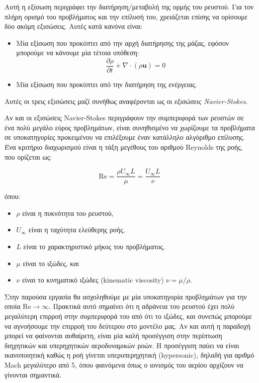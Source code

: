 Αυτή η εξίσωση περιγράφει την διατήρηση/μεταβολή της ορμής του ρευστού.
Για τον πλήρη ορισμό του προβλήματος και την επίλυσή του, χρειάζεται επίσης να ορίσουμε δύο ακόμη εξισώσεις.
Αυτές κατά κανόνα είναι:

\begin{itemize}
    \item Μία εξίσωση που προκύπτει από την αρχή διατήρησης της μάζας, εφόσον μπορούμε να κάνουμε μία τέτοια υπόθεση:
        \begin{equation*}
            \frac{\partial \rho}{\partial t} + \nabla \cdot \left( \rho \mathbf{u} \right) = 0
        \end{equation*}
    \item Μία εξίσωση που προκύπτει από την διατήρηση της ενέργειας.
\end{itemize}

Αυτές οι τρεις εξισώσεις μαζί συνήθως αναφέρονται ως οι \emph{εξισώσεις Navier-Stokes}.

Αν και οι εξισώσεις Navier-Stokes περιγράφουν την συμπεριφορά των ρευστών σε ένα πολύ μεγάλο εύρος προβλημάτων, είναι συνηθισμένο να χωρίζουμε τα προβλήματα σε υποκατηγορίες προκειμένου να επιλέξουμε έναν κατάλληλο αλγόριθμο επίλυσης.
Ένα κριτήριο διαχωρισμού είναι η τάξη μεγέθους του αριθμού Reynolds της ροής, που ορίζεται ως:

\begin{equation*}
    \mathrm{Re} = \frac{\rho U_{\infty} L}{\mu} = \frac{U_\infty L}{\nu}
\end{equation*}

όπου:

\begin{itemize}
    \item $\rho$ είναι η πυκνότητα του ρευστού,
    \item $U_{\infty}$ είναι η ταχύτητα ελεύθερης ροής,
    \item $L$ είναι το χαρακτηριστικό μήκος του προβλήματος,
    \item $\mu$ είναι το ιξώδες, και
    \item $\nu$ είναι το κινηματικό ιξώδες (kinematic viscosity) $\nu = \mu / \rho$.
\end{itemize}

Στην παρούσα εργασία θα ασχοληθούμε με μία υποκατηγορία προβλημάτων για την οποία $\mathrm{Re} \to \infty$.
Πρακτικά αυτό σημαίνει ότι η αδράνεια του ρευστού έχει πολύ μεγαλύτερη επιρροή στην συμπεριφορά του από ότι το ιξώδες, και συνεπώς μπορούμε να αγνοήσουμε την επιρροή του δεύτερου στο μοντέλο μας.
Αν και αυτή η παραδοχή μπορεί να φαίνονται αυθαίρετη, είναι μία καλή προσέγγιση στην περίπτωση διηχητικών και υπερηχητικών αεροδυναμικών ροών.
Η προσέγγιση παύει να είναι ικανοποιητική καθώς η ροή γίνεται υπερυπερηχητική (hypersonic), δηλαδή για αριθμό Mach μεγαλύτερο από 5, όπου φαινόμενα όπως ο ιονισμός του αερίου αρχίζουν να γίνονται σημαντικά.

